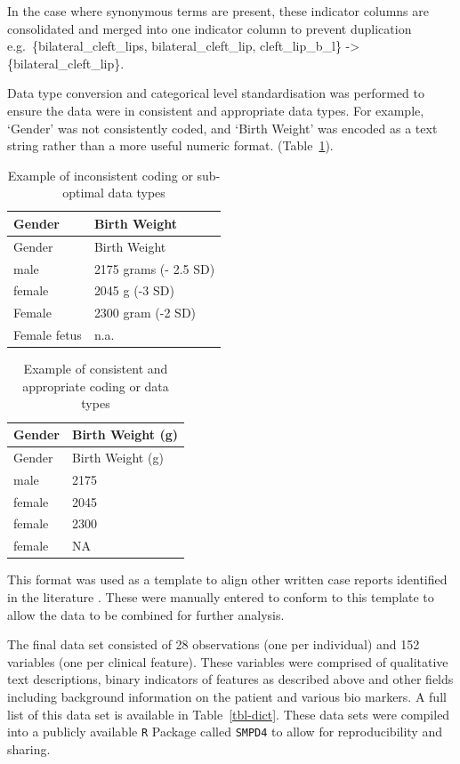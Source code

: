 \documentclass[
  authoryear,
  preprint,
  3p]{elsarticle}
\begin{document}
In the case where synonymous terms are present, these indicator columns
are consolidated and merged into one indicator column to prevent
duplication e.g.~\{bilateral\_cleft\_lips, bilateral\_cleft\_lip,
cleft\_lip\_b\_l\} -\textgreater{} \{bilateral\_cleft\_lip\}.

Data type conversion and categorical level standardisation was performed
to ensure the data were in consistent and appropriate data types. For
example, `Gender' was not consistently coded, and `Birth Weight' was
encoded as a text string rather than a more useful numeric format.
(Table~\ref{tbl-data-types}).

\hypertarget{tbl-data-types}{}
\begin{longtable}[]{@{}ll@{}}
\caption{\label{tbl-data-types}Example of inconsistent coding or
sub-optimal data types}\tabularnewline
\toprule()
Gender & Birth Weight \\
\midrule()
\endfirsthead
\toprule()
Gender & Birth Weight \\
\midrule()
\endhead
male & 2175 grams (- 2.5 SD) \\
female & 2045 g (-3 SD) \\
Female & 2300 gram (-2 SD) \\
Female fetus & n.a. \\
\bottomrule()
\end{longtable}

\hypertarget{tbl-data-types2}{}
\begin{longtable}[]{@{}ll@{}}
\caption{\label{tbl-data-types2}Example of consistent and appropriate
coding or data types}\tabularnewline
\toprule()
Gender & Birth Weight (g) \\
\midrule()
\endfirsthead
\toprule()
Gender & Birth Weight (g) \\
\midrule()
\endhead
male & 2175 \\
female & 2045 \\
female & 2300 \\
female & NA \\
\bottomrule()
\end{longtable}

This format was used as a template to align other written case reports
identified in the literature
\citep{ravenscroft2021neurogenetic, monies2019lessons, bijarnia2022growth, ji2022case}.
These were manually entered to conform to this template to allow the
data to be combined for further analysis.

The final data set consisted of 28 observations (one per individual) and
152 variables (one per clinical feature). These variables were comprised
of qualitative text descriptions, binary indicators of features as
described above and other fields including background information on the
patient and various bio markers. A full list of this data set is
available in Table~\ref{tbl-dict}. These data sets were compiled into a
publicly available \texttt{R} Package called \texttt{SMPD4}
\citep{smpd4-data} to allow for reproducibility and sharing.
\end{document}
